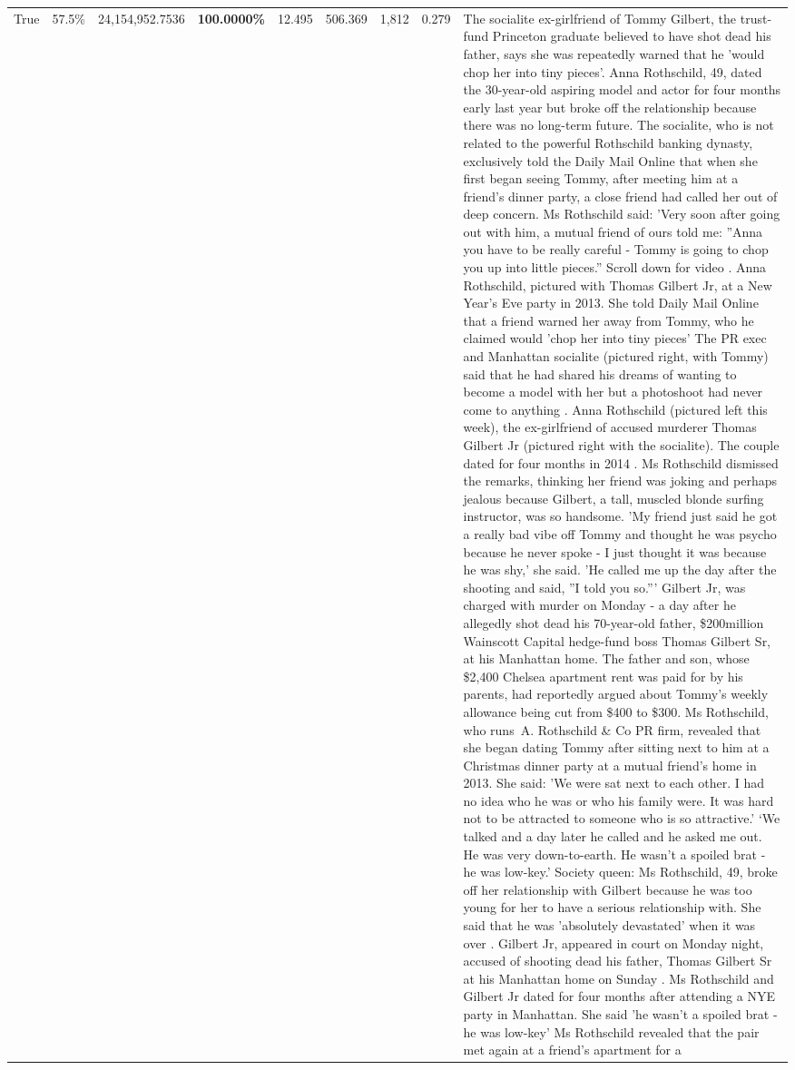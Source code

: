 \begin{table}[H]
\begin{tabular}{lllrlllll}
True & 57.5\% & 24,154,952.7536 & \bfseries \color{red} 100.0000\% & 12.495 & 506.369 & 1,812 & 0.279 & The socialite ex-girlfriend of Tommy Gilbert, the trust-fund Princeton graduate believed to have shot dead his father, says she was repeatedly warned that he 'would chop her into tiny pieces'. Anna Rothschild, 49, dated the 30-year-old aspiring model and actor for four months early last year but broke off the relationship because there was no long-term future. The socialite, who is not related to the powerful Rothschild banking dynasty, exclusively told the Daily Mail Online that when she first began seeing Tommy, after meeting him at a friend's dinner party, a close friend had called her out of deep concern. Ms Rothschild said: 'Very soon after going out with him, a mutual friend of ours told me: ''Anna you have to be really careful - Tommy is going to chop you up into little pieces.'' Scroll down for video . Anna Rothschild, pictured with Thomas Gilbert Jr, at a New Year's Eve party in 2013. She told Daily Mail Online that a friend warned her away from Tommy, who he claimed would 'chop her into tiny pieces' The PR exec and Manhattan socialite (pictured right, with Tommy) said that he had shared his dreams of wanting to become a model with her but a photoshoot had never come to anything . Anna Rothschild (pictured left this week), the ex-girlfriend of accused murderer Thomas Gilbert Jr (pictured right with the socialite). The couple dated for four months in 2014 . Ms Rothschild dismissed the remarks, thinking her friend was joking and perhaps jealous because Gilbert, a tall, muscled blonde surfing instructor, was so handsome. 'My friend just said he got a really bad vibe off Tommy and thought he was psycho because he never spoke - I just thought it was because he was shy,' she said. 'He called me up the day after the shooting and said, ''I told you so.''' Gilbert Jr, was charged with murder on Monday - a day after he allegedly shot dead his 70-year-old father, \$200million Wainscott Capital hedge-fund boss Thomas Gilbert Sr, at his Manhattan home. The father and son, whose \$2,400 Chelsea apartment rent was paid for by his parents, had reportedly argued about Tommy's weekly allowance being cut from \$400 to \$300. Ms Rothschild, who runs A. Rothschild \& Co PR firm, revealed that she began dating Tommy after sitting next to him at a Christmas dinner party at a mutual friend's home in 2013. She said: 'We were sat next to each other. I had no idea who he was or who his family were. It was hard not to be attracted to someone who is so attractive.' ‘We talked and a day later he called and he asked me out. He was very down-to-earth. He wasn’t a spoiled brat - he was low-key.’ Society queen: Ms Rothschild, 49, broke off her relationship with Gilbert because he was too young for her to have a serious relationship with. She said that he was 'absolutely devastated' when it was over . Gilbert Jr, appeared in court on Monday night, accused of shooting dead his father, Thomas Gilbert Sr at his Manhattan home on Sunday . Ms Rothschild and Gilbert Jr dated for four months after attending a NYE party in Manhattan. She said 'he wasn't a spoiled brat - he was low-key' Ms Rothschild revealed that the pair met again at a friend’s apartment for a 
\end{tabular}
\end{table}
